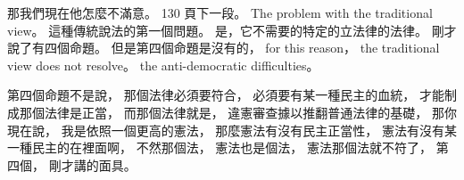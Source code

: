 \hypertarget{w02:cue:1739}{}那我們現在他怎麼不滿意。
\hypertarget{w02:cue:1740}{}130 頁下一段。
\hypertarget{w02:cue:1741}{}The problem with the traditional view。
\hypertarget{w02:cue:1742}{}這種傳統說法的第一個問題。
\hypertarget{w02:cue:1743}{}是，它不需要的特定的立法律的法律。
\hypertarget{w02:cue:1744}{}剛才說了有四個命題。
\hypertarget{w02:cue:1745}{}但是第四個命題是沒有的，
\hypertarget{w02:cue:1746}{}for this reason，
\hypertarget{w02:cue:1747}{}the traditional view does not resolve。
\hypertarget{w02:cue:1748}{}the anti-democratic difficulties。

\hypertarget{w02:cue:1749}{}第四個命題不是說，
\hypertarget{w02:cue:1750}{}那個法律必須要符合，
\hypertarget{w02:cue:1751}{}必須要有某一種民主的血統，
\hypertarget{w02:cue:1752}{}才能制成那個法律是正當，
\hypertarget{w02:cue:1753}{}而那個法律就是，
\hypertarget{w02:cue:1754}{}違憲審查據以推翻普通法律的基礎，
\hypertarget{w02:cue:1755}{}那你現在說，
\hypertarget{w02:cue:1756}{}我是依照一個更高的憲法，
\hypertarget{w02:cue:1757}{}那麼憲法有沒有民主正當性，
\hypertarget{w02:cue:1758}{}憲法有沒有某一種民主的在裡面啊，
\hypertarget{w02:cue:1759}{}不然那個法，
\hypertarget{w02:cue:1760}{}憲法也是個法，
\hypertarget{w02:cue:1761}{}憲法那個法就不符了，
\hypertarget{w02:cue:1762}{}第四個，
\hypertarget{w02:cue:1763}{}剛才講的面具。

